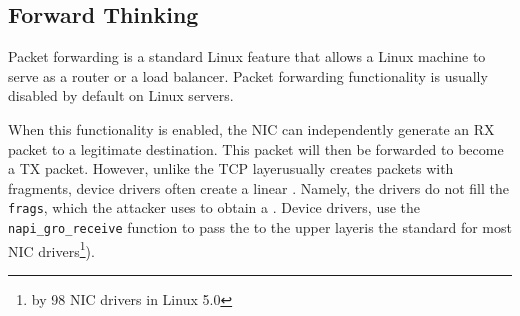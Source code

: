 




\subsection{\DIFdelbegin {}\DIFdelend Forward Thinking \Compound \DIFdelbegin {}\DIFdelend \DIFaddbegin {}\DIFaddend }\label{appx:additional_compound}


Packet forwarding is a standard Linux feature that allows a Linux machine to serve as a router or a load balancer. Packet forwarding functionality is usually disabled by default on Linux servers.

When this functionality is enabled, the NIC can independently generate an RX packet to a legitimate destination. This packet will then be forwarded to become a TX packet. However, unlike \DIFdelbegin {}\DIFdelend the TCP layer\DIFdelbegin {}\DIFdelend \DIFaddbegin {}\DIFaddend usually creates \skb{} packets with fragments, device drivers often create a linear \skb{}. Namely, the drivers do not fill the \texttt{frags}, which the attacker uses to obtain a \kva. Device drivers, use the \DIFdelbegin %
\DIFdelend \texttt{napi\_gro\_receive} function to pass the \skb{} to the upper layer\DIFdelbegin {}\DIFdelend \DIFaddbegin {}\DIFaddend is the standard for most NIC drivers\footnote{\DIFdelbegin {}\DIFdelend \DIFaddbegin {}\DIFaddend by 98 NIC drivers \DIFdelbegin \DIFdel{, }\DIFdelend in Linux 5.0}). 

